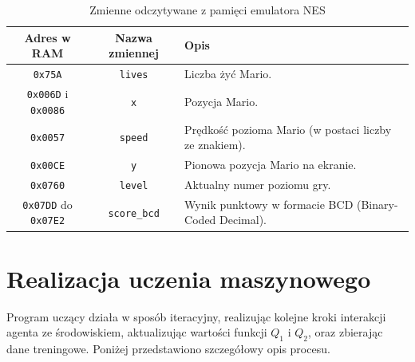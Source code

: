 \begin{table}[!ht]
	\centering
	\caption{Zmienne odczytywane z pamięci emulatora NES}
	\label{tab:nes_memory}
	\begin{tabular}{|c|c|p{5cm}|}
		\hline
		\textbf{Adres w RAM}               & \textbf{Nazwa zmiennej} & \textbf{Opis}                                         \\ \hline
		\texttt{0x75A}                     & \texttt{lives}          & Liczba żyć Mario.                                     \\ \hline
		\texttt{0x006D} i \texttt{0x0086}  & \texttt{x}              & Pozycja Mario.                                        \\ \hline
		\texttt{0x0057}                    & \texttt{speed}          & Prędkość pozioma Mario (w postaci liczby ze znakiem). \\ \hline
		\texttt{0x00CE}                    & \texttt{y}              & Pionowa pozycja Mario na ekranie.                     \\ \hline
		\texttt{0x0760}                    & \texttt{level}          & Aktualny numer poziomu gry.                           \\ \hline
		\texttt{0x07DD} do \texttt{0x07E2} & \texttt{score\_bcd}     & Wynik punktowy w formacie BCD (Binary-Coded Decimal). \\ \hline
	\end{tabular}
\end{table}
\section{Realizacja uczenia maszynowego}

Program uczący działa w sposób iteracyjny, realizując kolejne kroki interakcji agenta ze środowiskiem, aktualizując wartości funkcji \(Q_1\) i \(Q_2\), oraz zbierając dane treningowe. Poniżej przedstawiono szczegółowy opis procesu.

